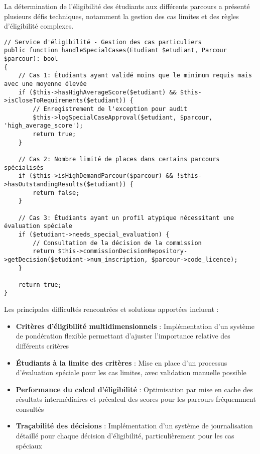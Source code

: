 \documentclass[french,12pt]{report} %
\begin{document}
La détermination de l'éligibilité des étudiants aux différents parcours a présenté plusieurs défis techniques, notamment la gestion des cas limites et des règles d'éligibilité complexes.

\begin{lstlisting}[style=phpstyle,caption={Extrait du code de gestion des cas limites d'éligibilité}]
// Service d'éligibilité - Gestion des cas particuliers
public function handleSpecialCases(Etudiant $etudiant, Parcour $parcour): bool
{
    // Cas 1: Étudiants ayant validé moins que le minimum requis mais avec une moyenne élevée
    if ($this->hasHighAverageScore($etudiant) && $this->isCloseToRequirements($etudiant)) {
        // Enregistrement de l'exception pour audit
        $this->logSpecialCaseApproval($etudiant, $parcour, 'high_average_score');
        return true;
    }
    
    // Cas 2: Nombre limité de places dans certains parcours spécialisés
    if ($this->isHighDemandParcour($parcour) && !$this->hasOutstandingResults($etudiant)) {
        return false;
    }
    
    // Cas 3: Étudiants ayant un profil atypique nécessitant une évaluation spéciale
    if ($etudiant->needs_special_evaluation) {
        // Consultation de la décision de la commission
        return $this->commissionDecisionRepository->getDecision($etudiant->num_inscription, $parcour->code_licence);
    }
    
    return true;
}
\end{lstlisting}

Les principales difficultés rencontrées et solutions apportées incluent :

\begin{itemize}
    \item \textbf{Critères d'éligibilité multidimensionnels} : Implémentation d'un système de pondération flexible permettant d'ajuster l'importance relative des différents critères
    \item \textbf{Étudiants à la limite des critères} : Mise en place d'un processus d'évaluation spéciale pour les cas limites, avec validation manuelle possible
    \item \textbf{Performance du calcul d'éligibilité} : Optimisation par mise en cache des résultats intermédiaires et précalcul des scores pour les parcours fréquemment consultés
    \item \textbf{Traçabilité des décisions} : Implémentation d'un système de journalisation détaillé pour chaque décision d'éligibilité, particulièrement pour les cas spéciaux
\end{itemize}
\end{document}
